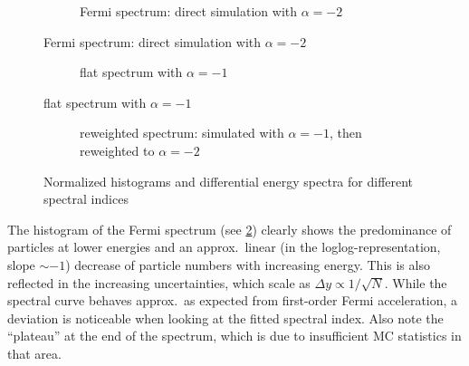 
\begin{figure}[b!]
    \centering
    \begin{subfigure}[b]{.75\textwidth}
        \centering
        \caption{Fermi spectrum: direct simulation with $\alpha=-2$}
        \label{fig:rew-fermi}
    \end{subfigure}
\end{figure}
\begin{figure}[b!]
    \ContinuedFloat
    \centering
    \begin{subfigure}[b]{.75\textwidth}
        \centering
        \caption{flat spectrum with $\alpha=-1$}
        \label{fig:rew-flat}
    \end{subfigure}
\end{figure}
\begin{figure}[t!]
    \ContinuedFloat
    \centering
    \begin{subfigure}[b]{.75\textwidth}
        \centering
        \caption{reweighted spectrum: simulated with $\alpha=-1$, then
            reweighted to $\alpha=-2$}
        \label{fig:rew-rew}
    \end{subfigure}

    \caption{Normalized histograms and differential energy spectra for
    different spectral indices}
    \label{fig:rew}
\end{figure}

The histogram of the Fermi spectrum (see \cref{fig:rew-fermi}) clearly shows
the predominance of particles at lower energies and an approx.~linear (in
the loglog-representation, slope $\sim-1$) decrease of particle numbers with
increasing energy. This is also reflected in the increasing uncertainties,
which scale as $\Delta{y}\propto1/\sqrt{N}$.
While the spectral curve behaves approx.~as expected from first-order Fermi
acceleration, a deviation is noticeable when looking at the fitted spectral
index.
Also note the \enquote{plateau} at the end of the spectrum, which is due to
insufficient MC statistics in that area.

